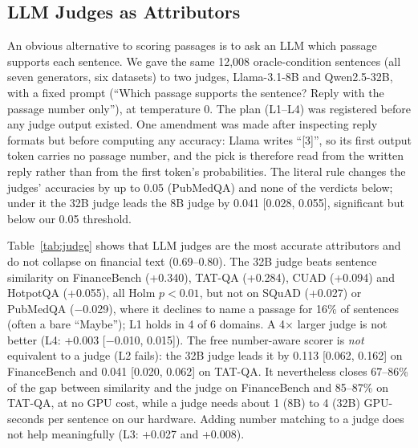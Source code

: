 \documentclass[conference]{IEEEtran}
\begin{document}
\subsection{LLM Judges as Attributors}
\label{sec:judge}
An obvious alternative to scoring passages is to ask an LLM which passage supports each sentence. We gave the same 12,008 oracle-condition sentences
(all seven generators, six datasets) to two judges, Llama-3.1-8B and Qwen2.5-32B, with a fixed prompt (``Which passage supports the sentence?
Reply with the passage number only''), at temperature 0. The plan (L1--L4) was registered before any judge output existed. One amendment was made
after inspecting reply formats but before computing any accuracy: Llama writes ``[3]'', so its first output token carries no passage number, and the
pick is therefore read from the written reply rather than from the first token's probabilities. The literal rule changes the judges' accuracies by
up to 0.05 (PubMedQA) and none of the verdicts below; under it the 32B judge leads the 8B judge by 0.041 [0.028, 0.055], significant but below our
0.05 threshold.

Table~\ref{tab:judge} shows that LLM judges are the most accurate attributors and do not collapse on financial text (0.69--0.80). The 32B judge beats
sentence similarity on FinanceBench (+0.340), TAT-QA (+0.284), CUAD (+0.094) and HotpotQA (+0.055), all Holm $p<0.01$, but not on SQuAD (+0.027) or
PubMedQA ($-$0.029), where it declines to name a passage for 16\% of sentences (often a bare ``Maybe''); L1 holds in 4 of 6 domains. A 4$\times$
larger judge is not better (L4: +0.003 [$-$0.010, 0.015]). The free number-aware scorer is \emph{not} equivalent to a judge (L2 fails): the 32B judge
leads it by 0.113 [0.062, 0.162] on FinanceBench and 0.041 [0.020, 0.062] on TAT-QA. It nevertheless closes 67--86\% of the gap between similarity
and the judge on FinanceBench and 85--87\% on TAT-QA, at no GPU cost, while a judge needs about 1 (8B) to 4 (32B) GPU-seconds per sentence on our
hardware. Adding number matching to a judge does not help meaningfully (L3: +0.027 and +0.008).
\end{document}

